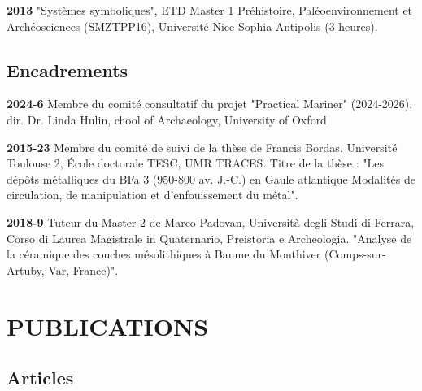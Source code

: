 \documentclass{article}
\newcommand{\fr}[1]{#1}       %
\newcommand{\en}[1]{}     %
\begin{document}
\smallbreak
\textbf{2013}
\fr{"Systèmes symboliques", ETD Master 1 Préhistoire, Paléoenvironnement et Archéosciences (SMZTPP16), Université Nice Sophia-Antipolis (3 heures).}
\en{"Symbolic Systems", ETD Master 1 in Prehistory, Paleoenvironment, and Archaeosciences (SMZTPP16), University of Nice Sophia-Antipolis (3 hours).}

\subsection*{\fr{Encadrements}\en{Supervisions}}

\textbf{2024-6}
\fr{Membre du comité consultatif du projet "Practical Mariner" (2024-2026), dir. Dr. Linda Hulin, chool of Archaeology, University of Oxford}
\en{Member of the "Practical Mariner" project (2024-6) Advisory Board, dir. Dr. Linda Hulin, School of Archaeology, University of Oxford}

\textbf{2015-23}
\fr{Membre du comité de suivi de la thèse de Francis Bordas, Université Toulouse 2, École doctorale TESC, UMR TRACES. Titre de la thèse : "Les dépôts métalliques du BFa 3 (950-800 av. J.-C.) en Gaule atlantique Modalités de circulation, de manipulation et d’enfouissement du métal".}
\en{Member of the thesis monitoring committee for Francis Bordas, University of Toulouse 2, Doctoral School TESC, UMR TRACES. Thesis title: "Metallic deposits of BFa 3 (950-800 BC) in Atlantic Gaul: Modes of circulation, handling, and burial of metal".}

\smallbreak
\textbf{2018-9}
\fr{Tuteur du Master 2 de Marco Padovan, Università degli Studi di Ferrara, Corso di Laurea Magistrale in Quaternario, Preistoria e Archeologia. "Analyse de la céramique des couches mésolithiques à Baume du Monthiver (Comps-sur-Artuby, Var, France)".}
\en{Supervisor for the Master 2 of Marco Padovan, University of Ferrara, Master's Degree in Quaternary, Prehistory and Archaeology. "Analysis of the ceramics from the Mesolithic layers at Baume du Monthiver (Comps-sur-Artuby, Var, France)".}

\section{PUBLICATIONS}

\subsection*{\fr{Articles}\en{Articles}}
\end{document}

